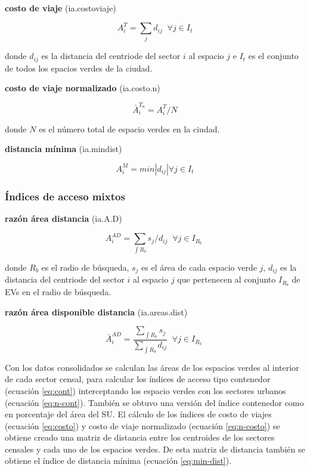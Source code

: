 \documentclass[12pt,]{book}
\begin{document}
\textbf{costo de viaje} (ia.costoviaje)

\begin{equation}
A^{T}_i =\sum_j{d_{ij}} \; \; \forall  j \in I_t
\label{eq:costo}
\end{equation}

donde \(d_{ij}\) es la distancia del centriode del sector \(i\) al
espacio \(j\) e \(I_t\) es el conjunto de todos los epacios verdes de la
ciudad.

\textbf{costo de viaje normalizado} (ia.costo.n)

\begin{equation}
\bar{A}^{T_n}_i =A^{T}_i/N 
\label{eq:n-costo}
\end{equation}

donde \(N\) es el número total de espacio verdes en la ciudad.

\textbf{distancia mínima} (ia.mindist)

\begin{equation}
A^{M}_i=min\left | d_{ij} \right | \forall  j \in I_t
\label{eq:min-dist}
\end{equation}

\subsubsection*{Índices de acceso
mixtos}\label{indices-de-acceso-mixtos}

\textbf{razón área distancia} (ia.A.D)

\begin{equation}
A^{AD}_i= \sum_{\int R_b }{s_j/d_{ij}}  \;  \; \forall  j \in I_{R_b} \; 
\label{eq:area-dist}
\end{equation}

donde \(R_b\) es el radio de búsqueda, \(s_j\) es el área de cada
espacio verde \(j\), \(d_{ij}\) es la distancia del centriode del sector
\(i\) al espacio \(j\) que pertenecen al conjunto \(I_{R_b}\) de EVs en
el radio de búsqueda.

\textbf{razón área disponible distancia} (ia.areas.dist)

\begin{equation}
\bar{A}^{AD}_i= \frac{\sum_{\int R_b }{s_j}}{\sum_{\int R_b }{d_{ij}}}  \;  \; \forall  j \in I_{R_b} \; 
\label{eq:areas-dists}
\end{equation}

Con los datos consolidados se calculan las áreas de los espacios verdes
al interior de cada sector censal, para calcular los índices de acceso
tipo contenedor (ecuación \eqref{eq:cont}) interceptando los espacio
verdes con los sectores urbanos (ecuación \eqref{eq:n-cont}). También se
obtuvo una versión del índice contenedor como en porcentaje del área del
SU. El cálculo de los índices de costo de viajes (ecuación
\eqref{eq:costo}) y costo de viaje normalizado (ecuación \eqref{eq:n-costo})
se obtiene creado una matriz de distancia entre los centroides de los
sectores censales y cada uno de los espacios verdes. De esta matriz de
distancia también se obtiene el índice de distancia mínima (ecuación
\eqref{eq:min-dist}).
\end{document}
